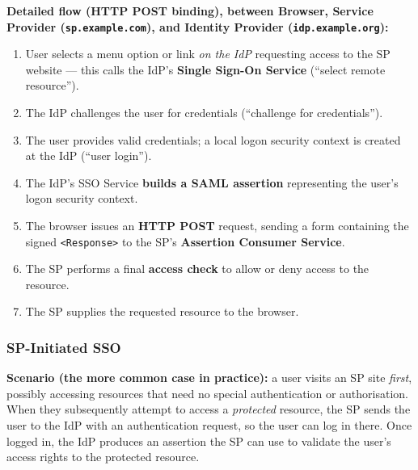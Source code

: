 \documentclass[12pt, a4paper]{article}
\begin{document}
\textbf{Detailed flow (HTTP POST binding), between Browser, Service Provider (\texttt{sp.example.com}), and Identity Provider (\texttt{idp.example.org}):}
\begin{enumerate}
    \item User selects a menu option or link \emph{on the IdP} requesting access to the SP website --- this calls the IdP's \textbf{Single Sign-On Service} (``select remote resource'').
    \item The IdP challenges the user for credentials (``challenge for credentials'').
    \item The user provides valid credentials; a local logon security context is created at the IdP (``user login'').
    \item The IdP's SSO Service \textbf{builds a SAML assertion} representing the user's logon security context.
    \item The browser issues an \textbf{HTTP POST} request, sending a form containing the signed \texttt{<Response>} to the SP's \textbf{Assertion Consumer Service}.
    \item The SP performs a final \textbf{access check} to allow or deny access to the resource.
    \item The SP supplies the requested resource to the browser.
\end{enumerate}

\subsubsection{SP-Initiated SSO}
\textbf{Scenario (the more common case in practice):} a user visits an SP site \emph{first}, possibly accessing resources that need no special authentication or authorisation. When they subsequently attempt to access a \emph{protected} resource, the SP sends the user to the IdP with an authentication request, so the user can log in there. Once logged in, the IdP produces an assertion the SP can use to validate the user's access rights to the protected resource.
\end{document}

